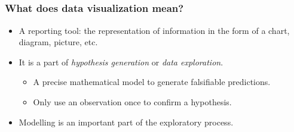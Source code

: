 \documentclass[11pt]{beamer}
\begin{document}
	\begin{frame}
		\section[]{}
		\frametitle{\bfseries What does data visualization mean?}
		
		\begin{itemize}
			\item A reporting tool: the representation of information in the form of a chart, diagram, picture, etc.
			\item It is a part of \textit{hypothesis generation} or \textit{data exploration}. 
			\begin{itemize}
				\item A precise mathematical model to generate falsifiable predictions.
				\item Only use an observation once to confirm a hypothesis.
			\end{itemize}
		\item Modelling is an important part of the exploratory process.
		\end{itemize}

	\end{frame}
\end{document}
